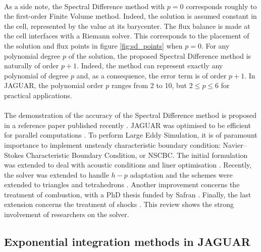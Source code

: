       \paragraph{}
      As a side note, the Spectral Difference method with $p = 0$ corresponds roughly to the first-order Finite Volume method.
      Indeed, the solution is assumed constant in the cell, represented by the value at its barycenter.
      The flux balance is made at the cell interfaces with a Riemann solver.
      This corresponds to the placement of the solution and flux points in figure \ref{fig:sd_points} when $p = 0$.
      For any polynomial degree $p$ of the solution, the proposed Spectral Difference method is naturally of order $p + 1$.
      Indeed, the method can represent exactly any polynomial of degree $p$ and, as a consequence, the error term is of order $p + 1$.
      In JAGUAR, the polynomial order $p$ ranges from 2 to 10, but $2 \le p \le 6$ for practical applications.

      \paragraph{}
      The demonstration of the accuracy of the Spectral Difference method is proposed in a reference paper published recently \cite{VanharenPuigtVasseurEtAl2017}.
      JAGUAR was optimised to be efficient for parallel computations \cite{Cassagne2014, CassagnePuigtBoussuge2015, Marait2015}.
      To perform Large Eddy Simulation, it is of paramount importance to implement unsteady characteristic boundary condition: Navier--Stokes Characteristic Boundary Condition, or NSCBC.
      The initial formulation \cite{FievetDeniauPiot2020} was extended to deal with acoustic conditions and liner optimisation \cite{CardesaFievetPiotEtAl2022}.
      Recently, the solver was extended to handle $h-p$ adaptation \cite{HartmannBalanBassiEtAl2021} and the schemes were extended to triangles and tetrahedrons \cite{VeilleuxPuigtDeniauEtAl2022, VeilleuxPuigtDeniauEtAl2022a}.
      Another improvement concerns the treatment of combustion, with a PhD thesis funded by Safran \cite{MarchalDeniauBoussugeEtAl2021}.
      Finally, the last extension concerns the treatment of shocks \cite{DeniauPuigt2022}.
      This review shows the strong involvement of researchers on the solver.


    \subsection{Exponential integration methods in JAGUAR}

